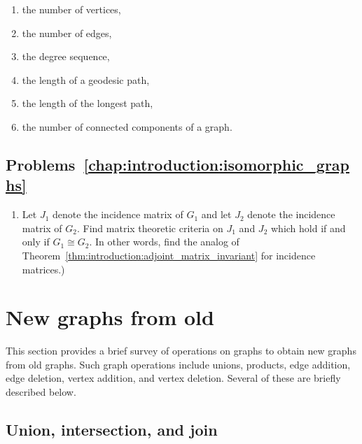\begin{enumerate}
\item the number of vertices,

\item the number of edges,

\item the degree sequence,

\item the length of a geodesic path,

\item the length of the longest path,

\item the number of connected components of a graph.
\end{enumerate}



\subsection*{Problems~\ref{chap:introduction:isomorphic_graphs}}

\begin{enumerate}
\item Let $J_1$ denote the incidence matrix of $G_1$ and let $J_2$
  denote the incidence matrix of $G_2$. Find matrix theoretic criteria
  on $J_1$ and $J_2$ which hold if and only if $G_1 \cong G_2$. In
  other words, find the analog of
  Theorem~\ref{thm:introduction:adjoint_matrix_invariant} for
  incidence matrices.)
\end{enumerate}



\section{New graphs from old}

This section provides a brief survey of operations on graphs to obtain
new graphs from old graphs. Such graph operations include unions,
products, edge addition, edge deletion, vertex addition, and vertex
deletion. Several of these are briefly described below.



\subsection{Union, intersection, and join}

